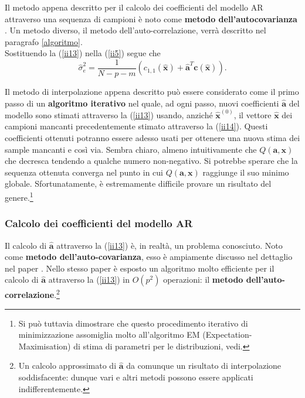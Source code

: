 \documentclass{article}
\begin{document}
Il metodo appena descritto per il calcolo dei coefficienti del modello AR attraverso una sequenza di campioni è noto come \textbf{metodo dell'autocovarianza} \cite{art5}. Un metodo diverso, il metodo dell'auto-correlazione, verrà descritto nel paragrafo \ref{algoritmo}.
\medskip
\\
Sostituendo la (\ref{ii13}) nella (\ref{ii5}) segue che
\begin{equation}
\hat{\sigma}_{e}^{2} = \frac{1}{N-p-m} (c_{1,1}(\mathbf{\hat{x}}) + 
\mathbf{\hat{a}}^{T}\mathbf{c}(\mathbf{\hat{x}})).
\end{equation}

Il metodo di interpolazione appena descritto può essere considerato come il primo passo di un \textbf{algoritmo iterativo} nel quale, ad ogni passo, nuovi coefficienti $\mathbf{\hat{a}}$ del modello sono stimati attraverso la (\ref{ii13}) usando, anziché $\mathbf{\hat{x}}^{(0)}$, il vettore $\mathbf{\hat{x}}$ dei campioni mancanti precedentemente stimato attraverso la (\ref{ii14}). 
Questi coefficienti ottenuti potranno essere adesso usati per ottenere una nuova stima dei sample mancanti e così via. Sembra chiaro, almeno intuitivamente che $Q(\mathbf{a},\mathbf{x})$ che decresca tendendo a qualche numero non-negativo. Si potrebbe sperare che la sequenza ottenuta converga nel punto in cui $Q(\mathbf{a},\mathbf{x})$ raggiunge il suo minimo globale. Sfortunatamente, è estremamente difficile provare un risultato del genere.\footnote{Si può tuttavia dimostrare che questo procedimento iterativo di minimizzazione assomiglia molto all'algoritmo EM (Expectation-Maximisation) di stima di parametri per le distribuzioni, vedi\cite[Appendice B]{paper_1986}.}


	\subsubsection{Calcolo dei coefficienti del modello AR}
Il calcolo di $\mathbf{\hat{a}}$ attraverso la (\ref{ii13}) è, in realtà, un problema conosciuto. Noto come \textbf{metodo dell'auto-covarianza}, esso è ampiamente discusso nel dettaglio nel paper \cite{art5}. Nello stesso paper è esposto un algoritmo molto efficiente per il calcolo di $\mathbf{\hat{a}}$ attraverso la (\ref{ii13}) in $O(p^{2})$ operazioni: il \textbf{metodo dell'auto-correlazione}.\footnote{Un calcolo approssimato di $\mathbf{\hat{a}}$ da comunque un risultato di interpolazione soddisfacente: dunque vari e altri metodi possono essere applicati indifferentemente.}
\end{document}
